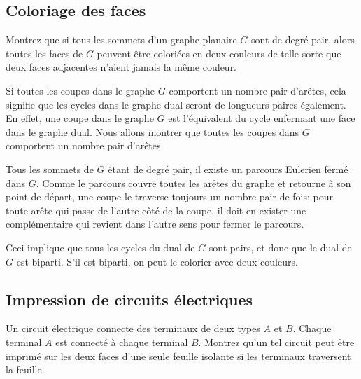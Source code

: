 \subsection{Coloriage des faces}
Montrez que si tous les sommets d’un graphe planaire $G$ sont de degré pair, alors toutes les faces de $G$ peuvent être coloriées en deux couleurs de telle sorte que deux faces adjacentes n’aient jamais la même couleur.

\begin{solution}
Si toutes les coupes dans le graphe $G$ comportent un nombre pair d'arêtes, cela signifie que les cycles dans le graphe dual seront de longueurs paires également.
En effet, une coupe dans le graphe $G$ est l'équivalent du cycle enfermant une face dans le graphe dual.
Nous allons montrer que toutes les coupes dans $G$ comportent un nombre pair d'arêtes.

Tous les sommets de $G$ étant de degré pair, il existe un parcours Eulerien fermé dans $G$.
Comme le parcours couvre toutes les arêtes du graphe et retourne à son point de départ, une coupe le traverse toujours un nombre pair de fois: pour toute arête qui passe de l'autre côté de la coupe, il doit en exister une complémentaire qui revient dans l'autre sens pour fermer le parcours.

Ceci implique que tous les cycles du dual de $G$ sont pairs, et donc que le dual de $G$ est biparti.
S'il est biparti, on peut le colorier avec deux couleurs.
\end{solution}

\subsection{Impression de circuits électriques}
Un circuit électrique connecte des terminaux de deux types $A$ et $B$. Chaque terminal $A$ est connecté à chaque terminal $B$. Montrez qu’un tel circuit peut être imprimé sur les deux faces d’une seule feuille isolante si les terminaux traversent la feuille.

\begin{solution}
  \nosolution
\end{solution}
